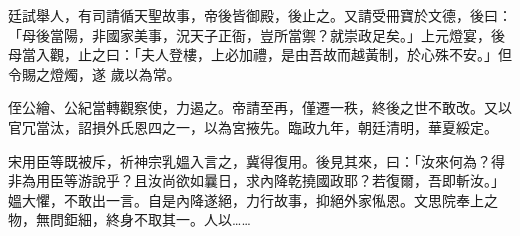 \begin{pinyinscope}
 廷試舉人，有司請循天聖故事，帝後皆御殿，後止之。又請受冊寶於文德，後曰：「母後當陽，非國家美事，況天子正衙，豈所當禦？就崇政足矣。」上元燈宴，後母當入觀，止之曰：「夫人登樓，上必加禮，是由吾故而越黃制，於心殊不安。」但令賜之燈燭，遂
 歲以為常。



 侄公繪、公紀當轉觀察使，力遏之。帝請至再，僅遷一秩，終後之世不敢改。又以官冗當汰，詔損外氏恩四之一，以為宮掖先。臨政九年，朝廷清明，華夏綏定。



 宋用臣等既被斥，祈神宗乳媼入言之，冀得復用。後見其來，曰：「汝來何為？得非為用臣等游說乎？且汝尚欲如曩日，求內降乾撓國政耶？若復爾，吾即斬汝。」媼大懼，不敢出一言。自是內降遂絕，力行故事，抑絕外家俬恩。文思院奉上之物，無問鉅細，終身不取其一。人以……



\end{pinyinscope}